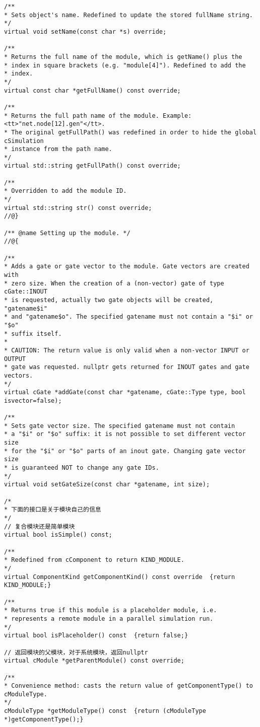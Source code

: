 \begin{lstlisting}
/**
* Sets object's name. Redefined to update the stored fullName string.
*/
virtual void setName(const char *s) override;

/**
* Returns the full name of the module, which is getName() plus the
* index in square brackets (e.g. "module[4]"). Redefined to add the
* index.
*/
virtual const char *getFullName() const override;

/**
* Returns the full path name of the module. Example: <tt>"net.node[12].gen"</tt>.
* The original getFullPath() was redefined in order to hide the global cSimulation
* instance from the path name.
*/
virtual std::string getFullPath() const override;

/**
* Overridden to add the module ID.
*/
virtual std::string str() const override;
//@}

/** @name Setting up the module. */
//@{

/**
* Adds a gate or gate vector to the module. Gate vectors are created with
* zero size. When the creation of a (non-vector) gate of type cGate::INOUT
* is requested, actually two gate objects will be created, "gatename$i"
* and "gatename$o". The specified gatename must not contain a "$i" or "$o"
* suffix itself.
*
* CAUTION: The return value is only valid when a non-vector INPUT or OUTPUT
* gate was requested. nullptr gets returned for INOUT gates and gate vectors.
*/
virtual cGate *addGate(const char *gatename, cGate::Type type, bool isvector=false);

/**
* Sets gate vector size. The specified gatename must not contain
* a "$i" or "$o" suffix: it is not possible to set different vector size
* for the "$i" or "$o" parts of an inout gate. Changing gate vector size
* is guaranteed NOT to change any gate IDs.
*/
virtual void setGateSize(const char *gatename, int size);

/*
* 下面的接口是关于模块自己的信息
*/
// 复合模块还是简单模块
virtual bool isSimple() const;

/**
* Redefined from cComponent to return KIND_MODULE.
*/
virtual ComponentKind getComponentKind() const override  {return KIND_MODULE;}

/**
* Returns true if this module is a placeholder module, i.e.
* represents a remote module in a parallel simulation run.
*/
virtual bool isPlaceholder() const  {return false;}

// 返回模块的父模块，对于系统模块，返回nullptr
virtual cModule *getParentModule() const override;

/**
* Convenience method: casts the return value of getComponentType() to cModuleType.
*/
cModuleType *getModuleType() const  {return (cModuleType *)getComponentType();}


\end{lstlisting}
